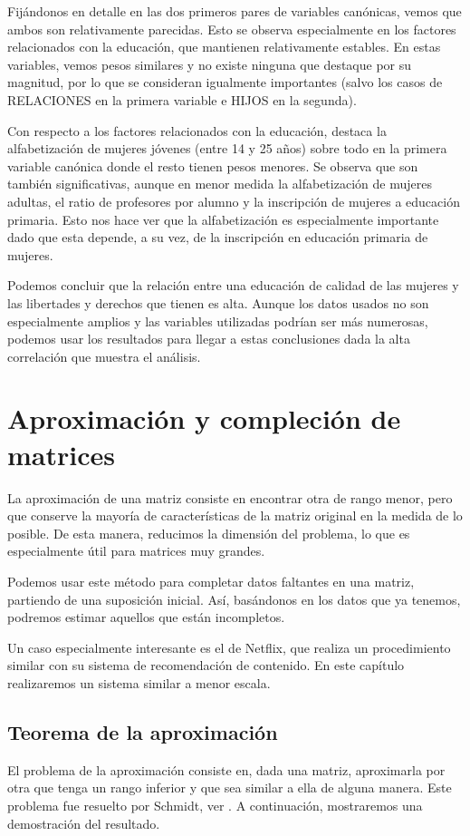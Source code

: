 \documentclass[tfg,cienciasbased,lot,lof,covers,final,overleaf,nocopyright]{tfgtfmthesisuam}
\begin{document}
Fijándonos en detalle en las dos primeros pares de variables canónicas, vemos que ambos son relativamente parecidas. Esto se observa especialmente en los factores relacionados con la educación, que mantienen relativamente estables. En estas variables, vemos pesos similares y no existe ninguna que destaque por su magnitud, por lo que se consideran igualmente importantes (salvo los casos de RELACIONES en la primera variable e HIJOS en la segunda).

Con respecto a los factores relacionados con la educación, destaca la alfabetización de mujeres jóvenes (entre 14 y 25 años) sobre todo en la primera variable canónica donde el resto tienen pesos menores. Se observa que son también significativas, aunque en menor medida la alfabetización de mujeres adultas, el ratio de profesores por alumno y la inscripción de mujeres a educación primaria. Esto nos hace ver que la alfabetización es especialmente importante dado que esta depende, a su vez, de la inscripción en educación primaria de mujeres.

Podemos concluir que la relación entre una educación de calidad de las mujeres y las libertades y derechos que tienen es alta. Aunque los datos usados no son especialmente amplios y las variables utilizadas podrían ser más numerosas, podemos usar los resultados para llegar a estas conclusiones dada la alta correlación que muestra el análisis.

\chapter{Aproximación y compleción de matrices}

La aproximación de una matriz consiste en encontrar otra de rango menor, pero que conserve la mayoría de características de la matriz original en la medida de lo posible. De esta manera, reducimos la dimensión del problema, lo que es especialmente útil para matrices muy grandes.

Podemos usar este método para completar datos faltantes en una matriz, partiendo de una suposición inicial. Así, basándonos en los datos que ya tenemos, podremos estimar aquellos que están incompletos.

Un caso especialmente interesante es el de Netflix, que realiza un procedimiento similar con su sistema de recomendación de contenido. En este capítulo realizaremos un sistema similar a menor escala.

\section{Teorema de la aproximación}
El problema de la aproximación consiste en, dada una matriz, aproximarla por otra que tenga un rango inferior y que sea similar a ella de alguna manera. Este problema fue resuelto por Schmidt, ver \cite{Stewart}. A continuación, mostraremos una demostración del resultado.
\end{document}
